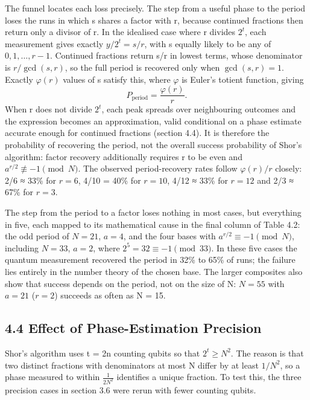 \documentclass[12pt,oneside]{report}
\begin{document}
The funnel locates each loss precisely. The step from a useful phase to the period loses the runs in which s shares a factor with r, because continued fractions then return only a divisor of r. In the idealised case where r divides $2^{t}$, each measurement gives exactly $y/2^{t} = s/r$, with s equally likely to be any of $0, 1, \ldots, r-1$. Continued fractions return s/r in lowest terms, whose denominator is $r/\gcd(s, r)$, so the full period is recovered only when $\gcd(s, r) = 1$. Exactly $\varphi(r)$ values of s satisfy this, where $\varphi$ is Euler's totient function, giving
\[ P_{\text{period}} = \frac{\varphi(r)}{r}. \]
When r does not divide $2^{t}$, each peak spreads over neighbouring outcomes and the expression becomes an approximation, valid conditional on a phase estimate accurate enough for continued fractions (section 4.4). It is therefore the probability of recovering the period, not the overall success probability of Shor's algorithm: factor recovery additionally requires r to be even and $a^{r/2} \not\equiv -1 \pmod{N}$. The observed period-recovery rates follow $\varphi(r)/r$ closely: 2/6 ≈ 33\% for $r = 6$, 4/10 = 40\% for $r = 10$, 4/12 ≈ 33\% for $r = 12$ and 2/3 ≈ 67\% for $r = 3$.
\par

The step from the period to a factor loses nothing in most cases, but everything in five, each mapped to its mathematical cause in the final column of Table 4.2: the odd period of $N = 21$, $a = 4$, and the four bases with $a^{r/2} \equiv -1 \pmod{N}$, including $N = 33$, $a = 2$, where $2^{5} = 32 \equiv -1 \pmod{33}$. In these five cases the quantum measurement recovered the period in 32\% to 65\% of runs; the failure lies entirely in the number theory of the chosen base. The larger composites also show that success depends on the period, not on the size of N: $N = 55$ with $a = 21$ ($r = 2$) succeeds as often as N = 15.
\par

\subsection*{4.4 Effect of Phase-Estimation Precision}

Shor's algorithm uses t = 2n counting qubits so that $2^{t} \ge N^{2}$. The reason is that two distinct fractions with denominators at most N differ by at least $1/N^{2}$, so a phase measured to within $\frac{1}{2N^{2}}$ identifies a unique fraction. To test this, the three precision cases in section 3.6 were rerun with fewer counting qubits.
\par
\end{document}
